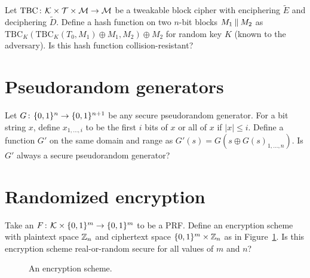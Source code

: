 \documentclass{article}
\newcommand{\keyspace}{\calK}
\newcommand{\tbce}{\widetilde{E}}
\newcommand{\tbcd}{\widetilde{D}}
\newcommand{\tbc}{\text{TBC}}
\newcommand{\tweakspace}{\calT}
\begin{document}



\begin{question} Let $\tbc\Colon\keyspace\times\tweakspace\times\msgspace\rightarrow\msgspace$ be a tweakable block cipher with enciphering $\tbce$ and deciphering $\tbcd$. Define a hash function on two $n$-bit blocks $M_1\: \| \: M_2$ as $\tbc_K(\tbc_K(T_0, M_1)\oplus M_1, M_2)\oplus M_2$ for random key $K$ (known to the adversary). Is this hash function collision-resistant?
\end{question}


\section*{Pseudorandom generators}

\begin{question} Let $G{\kern .05em}\colon{\kern .05em}\{0, 1\}^{n}\rightarrow\{0, 1\}^{n+1}$ be any secure pseudorandom generator. For a bit string $x$, define $x_{1, \ldots, i}$ to be the first $i$ bits of $x$ or all of $x$ if $|x|\leq i$. Define a function $G'$ on the same domain and range as $G'(s) = G(s\oplus G(s)_{1, \ldots, n})$. Is $G'$ always a secure pseudorandom generator?
\end{question}

\section*{Randomized encryption}

\begin{question}
Take an $F\Colon\keyspace\times\zon{m}\rightarrow\zon{m}$ to be a PRF. Define an encryption scheme with plaintext space $\mathbb{Z}_{n}$ and ciphertext space $\{0, 1\}^{m}\times\mathbb{Z}_{n}$ as in Figure~\ref{fig:modn_ctr}. Is this encryption scheme real-or-random secure for all values of $m$ and $n$?
\end{question}

\begin{figure}[h]
\centering
{}
\caption{An encryption scheme.}
\label{fig:modn_ctr}
\end{figure}
\end{document}

